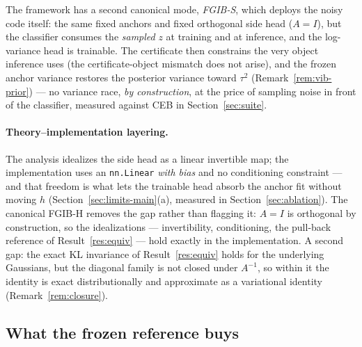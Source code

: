 \documentclass{article} %
\begin{document}
The framework has a second canonical mode, \emph{FGIB-S}, which deploys the noisy
code itself: the same fixed anchors and fixed orthogonal side head ($A{=}I$), but the
classifier consumes the \emph{sampled} $z$ at training and at inference, and the
log-variance head is trainable. The certificate then constrains the very object
inference uses (the certificate-object mismatch does not arise), and the frozen anchor
variance restores the posterior variance toward $\tau^2$
(Remark~\ref{rem:vib-prior}) --- no variance race, \emph{by construction}, at the price
of sampling noise in front of the classifier, measured against CEB in
Section~\ref{sec:suite}.

\paragraph{Theory--implementation layering.}
The analysis idealizes the side head as a linear invertible map; the implementation
uses an \texttt{nn.Linear} \emph{with bias} and no conditioning constraint --- and that
freedom is what lets the trainable head absorb the anchor fit without moving $h$
(Section~\ref{sec:limits-main}(a), measured in Section~\ref{sec:ablation}). The
canonical FGIB-H removes the gap rather than flagging it: $A = I$ is orthogonal by
construction, so the idealizations --- invertibility, conditioning, the pull-back
reference of Result~\ref{res:equiv} --- hold exactly in the implementation. A second
gap: the exact KL invariance of Result~\ref{res:equiv} holds for the underlying
Gaussians, but the diagonal family is not closed under $A^{-1}$, so within it the
identity is exact distributionally and approximate as a variational identity
(Remark~\ref{rem:closure}).

\subsection{What the frozen reference buys}
\end{document}
